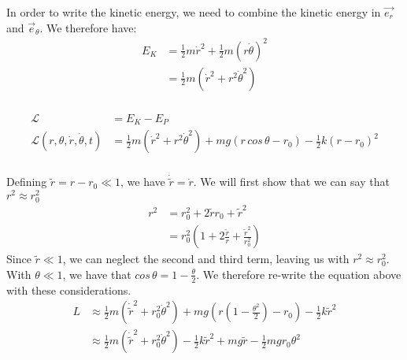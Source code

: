 \documentclass{article}
\begin{document}
\subsubsection{} %

In order to write the kinetic energy, we need to combine the kinetic energy in $\vec{e_r}$ and $\vec{e}_{\theta}$. We therefore have:
\begin{align*}
	E_K &= \frac{1}{2}m\dot{r}^2 + \frac{1}{2}m(r\dot{\theta})^2\\
	&= \frac{1}{2}m(\dot{r}^2 + r^2\dot{\theta}^2)
\end{align*}

\subsubsection{} %

\begin{align*}
	\mathcal{L} &= E_{K} - E_P\\
	\mathcal{L}(r,\theta,\dot{r},\dot{\theta},t) &= \frac{1}{2}m(\dot{r}^2 + r^2\dot{\theta}^2) + mg(r\,cos\,\theta - r_0) - \frac{1}{2}k(r-r_0)^2
\end{align*}

\subsubsection{} %

Defining $\tilde{r} = r - r_0 \ll 1$, we have $\dot{\tilde{r}} = \dot{r}$. We will first show that we can say that $r^2 \approx r_0^2$
\begin{align*}
	r^2 &= r_0^2 + 2\tilde{r}r_0 + \tilde{r}^2\\
	&= r_0^2\left( 1 + 2\frac{\tilde{r}}{r} +\frac{\tilde{r}^2}{r_0^2} \right)
\end{align*}
Since $\tilde{r} \ll 1$, we can neglect the second and third term, leaving us with $r^2 \approx r_0^2$.\\
With $\theta \ll 1$, we have that $cos\,\theta = 1 - \frac{\theta}{2}$. We therefore re-write the equation above with these considerations.
\begin{align*}
	L &\approx \frac{1}{2}m(\dot{\tilde{r}}^2 + r_0^2\dot{\theta}^2) + mg(r(1- \frac{\theta^2}{2})- r_0) - \frac{1}{2}k\tilde{r}^2\\
	&\approx \frac{1}{2}m(\dot{\tilde{r}}^2 + r_0^2\dot{\theta}^2)  - \frac{1}{2}k\tilde{r}^2 +mg\tilde{r} - \frac{1}{2}mgr_0\theta^2
\end{align*}
\end{document}
